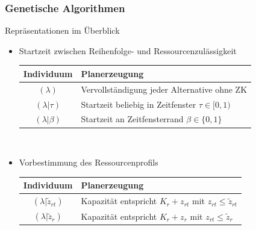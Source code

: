 \begin{frame}
\frametitle{Genetische Algorithmen}
Repräsentationen im Überblick
\begin{itemize}
	\item \small{Startzeit zwischen Reihenfolge- und Ressourcenzulässigkeit}\\[2mm]
	\begin{small}
	\begin{tabular}{cp{7.5cm}}
	\hline
	Individuum & Planerzeugung\\
	\hline
	$(\lambda)$ & Vervollständigung jeder Alternative ohne ZK\\	
	$(\lambda|\tau)$& Startzeit beliebig in Zeitfenster $\tau \in [0,1)$\\
	$(\lambda|\beta)$& Startzeit an Zeitfensterrand $\beta \in \{0,1\}$\\
	\end{tabular}
	\end{small}\\[4mm]
	
	\item \small{Vorbestimmung des Ressourcenprofils}\\[2mm]
	\begin{small}
		\begin{tabular}{cp{7.5cm}}
			\hline
			Individuum & Planerzeugung\\
			\hline
			$(\lambda|\tilde{z}_{rt})$ & Kapazität entspricht $K_r+z_{rt}$ mit $z_{rt} \leq \tilde{z}_{rt}$ \\
			$(\lambda|\tilde{z}_r)$ & Kapazität entspricht $K_r+z_r$ mit $z_{rt} \leq \tilde{z}_{r}$\\
		\end{tabular}
	\end{small}
\end{itemize}
\end{frame}


